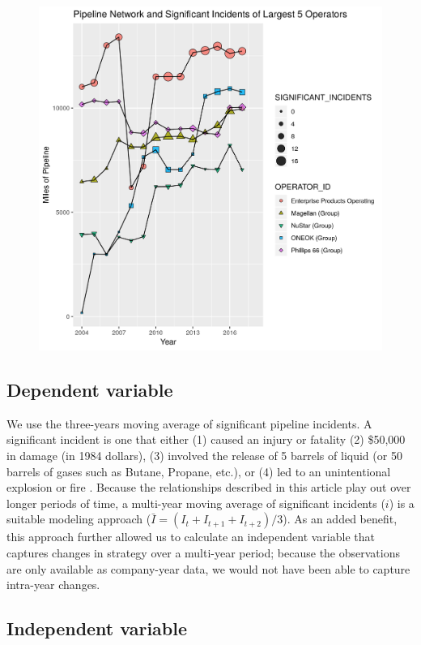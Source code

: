 \begin{figure}
	\includegraphics{illustrations/large_operators.png}
	\caption{}
\end{figure}

\subsection{Dependent variable}

We use the three-years moving average of significant pipeline incidents. A significant incident is one that either (1) caused an injury or fatality (2) \$50,000 in damage (in 1984 dollars), (3) involved the release of 5 barrels of liquid (or 50 barrels of gases such as Butane, Propane, etc.), or (4) led to an unintentional explosion or fire \citep{PHMSA}. Because the relationships described in this article play out over longer periods of time, a multi-year moving average of significant incidents ($i$) is a suitable modeling approach ($\bar{I} = (I_{t} + I_{t+1} + I_{t+2})/3$). As an added benefit, this approach further allowed us to calculate an independent variable that captures changes in strategy over a multi-year period; because the observations are only available as company-year data, we would not have been able to capture intra-year changes.

\subsection{Independent variable}

